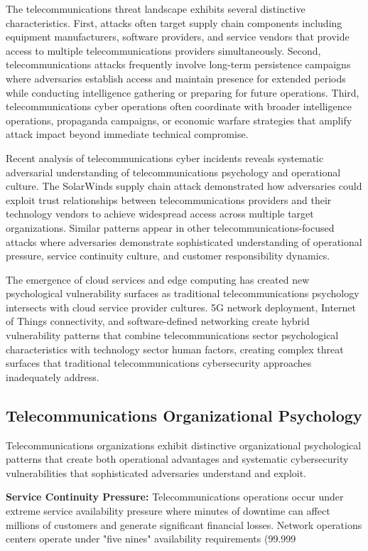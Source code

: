\documentclass[10pt, twocolumn]{article}
\begin{document}
The telecommunications threat landscape exhibits several distinctive characteristics. First, attacks often target supply chain components including equipment manufacturers, software providers, and service vendors that provide access to multiple telecommunications providers simultaneously. Second, telecommunications attacks frequently involve long-term persistence campaigns where adversaries establish access and maintain presence for extended periods while conducting intelligence gathering or preparing for future operations. Third, telecommunications cyber operations often coordinate with broader intelligence operations, propaganda campaigns, or economic warfare strategies that amplify attack impact beyond immediate technical compromise.

Recent analysis of telecommunications cyber incidents reveals systematic adversarial understanding of telecommunications psychology and operational culture. The SolarWinds supply chain attack demonstrated how adversaries could exploit trust relationships between telecommunications providers and their technology vendors to achieve widespread access across multiple target organizations. Similar patterns appear in other telecommunications-focused attacks where adversaries demonstrate sophisticated understanding of operational pressure, service continuity culture, and customer responsibility dynamics.

The emergence of cloud services and edge computing has created new psychological vulnerability surfaces as traditional telecommunications psychology intersects with cloud service provider cultures. 5G network deployment, Internet of Things connectivity, and software-defined networking create hybrid vulnerability patterns that combine telecommunications sector psychological characteristics with technology sector human factors, creating complex threat surfaces that traditional telecommunications cybersecurity approaches inadequately address.

\subsection{Telecommunications Organizational Psychology}

Telecommunications organizations exhibit distinctive organizational psychological patterns that create both operational advantages and systematic cybersecurity vulnerabilities that sophisticated adversaries understand and exploit.

\textbf{Service Continuity Pressure:} Telecommunications operations occur under extreme service availability pressure where minutes of downtime can affect millions of customers and generate significant financial losses. Network operations centers operate under "five nines" availability requirements (99.999%
\end{document}
